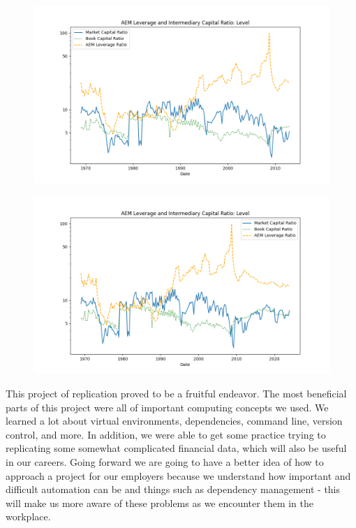 \documentclass{article}
\begin{document}
\begin{figure}[htbp]\centering\includegraphics[width=\linewidth]{table03_figure.png}\end{figure}\par
\begin{figure}[htbp]\centering\includegraphics[width=\linewidth]{updated_table03_figure.png}\end{figure}\par
\par
This project of replication proved to be a fruitful endeavor. The most beneficial parts of this project were all of important computing concepts we used. We learned a lot about virtual environments, dependencies, command line, version control, and more. In addition, we were able to get some practice trying to replicating some somewhat complicated financial data, which will also be useful in our careers.
Going forward we are going to have a better idea of how to approach a project for our employers because we understand how important and difficult automation can be and things such as dependency management - this will make us more aware of these problems as we encounter them in the workplace.\par
\end{document}
